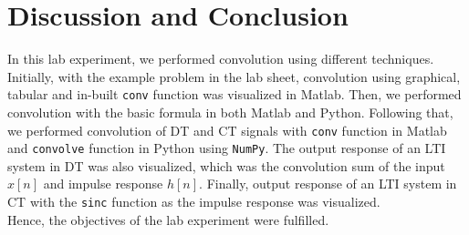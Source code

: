 \documentclass{lab_sheet}
\begin{document}
    \section{Discussion and Conclusion}
     In this lab experiment, we performed convolution using different techniques. Initially, with the example problem in the lab sheet, convolution using graphical, tabular and in-built \texttt{conv} function was visualized in Matlab. Then, we performed convolution with the basic formula in both Matlab and Python. Following that, we performed convolution of DT and CT signals with \texttt{conv} function in Matlab and \texttt{convolve} function in Python using \texttt{NumPy}. The output response of an LTI system in DT was also visualized, which was the convolution sum of the input $x[n]$ and impulse response $h[n]$. Finally, output response of an LTI system in CT with the \texttt{sinc} function as the impulse response was visualized.\\
     Hence, the objectives of the lab experiment were fulfilled. 
    
\end{document}
